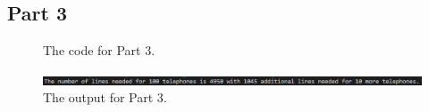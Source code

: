\documentclass{article}
\begin{document}
\begin{flushleft}
  \section{Part 3}
  \begin{figure}[!ht]
    \centering
    
    \caption{The code for Part 3.}
  \end{figure}
  \begin{figure}[!ht]
    \centering
    \includegraphics[width=\linewidth]{P3-Output.png}
    \caption{The output for Part 3.}
  \end{figure}
\end{flushleft}
\end{document}
